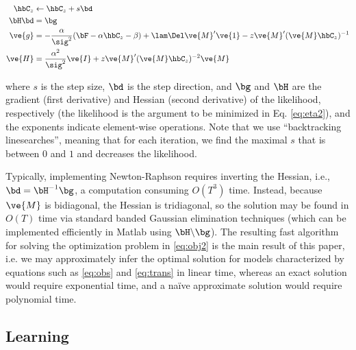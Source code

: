 \documentclass[12pt]{article}
\newcommand{\zzz}{z}
\begin{document}

\begin{subequations} \label{eq:NR}
\begin{align}
\hbC_{\zzz} &\leftarrow \hbC_{\zzz} + s \bd \\
\bH \bd &= \bg \\
\ve{g} &= -\frac{\alpha}{\sig^2}(\bF -\alpha \hbC_{\zzz} - \beta) + \lam \Del \ve{M}' \ve{1} - \zzz \ve{M}' (\ve{M} \hbC_{\zzz})^{-1} \label{eq:g} \\
\ve{H} &= \frac{\alpha^2}{\sig^2} \ve{I} + \zzz \ve{M}' (\ve{M} \hbC_{\zzz})^{-2} \ve{M} \label{eq:H}
\end{align}
\end{subequations}

\noindent where $s$ is the step size, $\bd$ is the step direction, and $\bg$ and $\bH$ are the gradient (first derivative) and Hessian (second derivative) of the likelihood, respectively (the likelihood is the argument to be minimized in Eq. \eqref{eq:eta2}), and the exponents indicate element-wise operations. Note that we use ``backtracking linesearches'', meaning that for each iteration, we find the maximal $s$ that is between $0$ and $1$ and decreases the likelihood.

Typically, implementing Newton-Raphson requires inverting the Hessian, i.e., $\bd = \bH^{-1} \bg$, a computation consuming $O(T^3)$ time. Instead, because $\ve{M}$ is bidiagonal, the Hessian is tridiagonal, so the solution may be found in $O(T)$ time via standard banded Gaussian elimination techniques (which can be implemented efficiently in Matlab using $\bH \backslash \bg$). The resulting fast algorithm for solving the optimization problem in \eqref{eq:obj2} is the main result of this paper, i.e.  we may approximately infer the optimal solution  for models characterized by equations such as \eqref{eq:obs} and \eqref{eq:trans} in linear time, whereas an exact solution would require exponential time, and a na\"{i}ve approximate solution would require polynomial time.  


\subsection{Learning} \label{sec:est}
\end{document}
